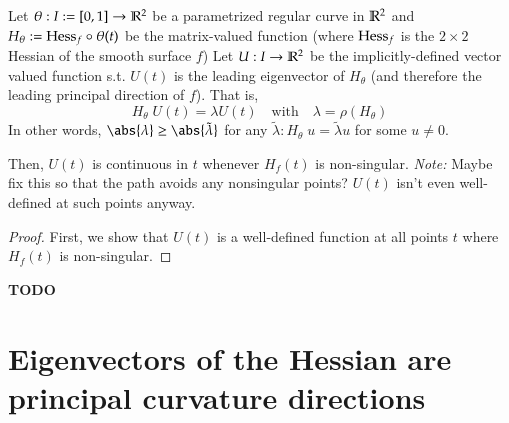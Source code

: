         \begin{theorem}
            Let $\theta: I:= [0,1] \to \mathbb{R}^2$ be a parametrized regular curve in $\mathbb{R}^2$ and
            $H_\theta := \mathrm{Hess}_f  \circ \theta(t)$ be the matrix-valued function
            (where $\mathrm{Hess}_f$ is the $2\times 2$ Hessian of the smooth surface $f$)
            Let $U:I \to \mathbb{R}^2$ be the implicitly-defined vector valued function s.t.
            $U(t)$ is the leading eigenvector of $H_\theta$
            (and therefore the leading principal direction of $f$). That is,
            \begin{equation}
                H_\theta \; U(t) = \lambda U(t) \quad \textrm{with}\quad \lambda = \rho(H_\theta)
            \end{equation}
            In other words, $\abs{\lambda} \ge \abs{\tilde{\lambda}}$ for any
            $\tilde{\lambda} : H_\theta \; u = \tilde{\lambda} u$ for some $u \ne 0$.
            
            Then, $U(t)$ is continuous in $t$ whenever $H_f(t)$ is non-singular.
            \textit{Note:} Maybe fix this so that the path avoids any nonsingular points?
            $U(t)$ isn't even well-defined at such points anyway.
        \end{theorem}
        \begin{proof}
            First, we show that $U(t)$ is a well-defined function at all points $t$ where
            $H_f(t)$ is non-singular.
        \end{proof}

         \maltese \textbf{TODO}       

\hrulefill

\section{Eigenvectors of the Hessian are principal curvature directions}
%	
	
        
